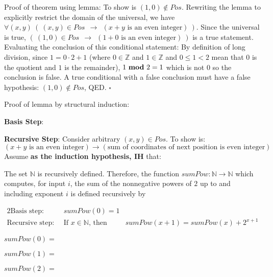 \documentclass[12pt, oneside]{article}
\begin{document}
Proof of theorem using lemma: To show is $(1,0) \notin Pos$. Rewriting the lemma to explicitly 
restrict the domain of the universal, 
we have $\forall (x,y) ~(~ (x,y) \in Pos~~  \to ~~(x+y \textrm{ is an even integer})~)$.  Since
the universal is true, 
$ (~ (1,0) \in Pos~~ \to ~~(1+0 \textrm{ is an even integer})~)$ is a true statement.
Evaluating the conclusion of this conditional statement: 
By definition of long division, since $1 = 0 \cdot 2 + 1$ (where $0 \in \mathbb{Z}$ and 
$1 \in \mathbb{Z}$ and $0 \leq 1 < 2$ mean that $0$ is the quotient and $1$ is the remainder), $1 ~\textrm{\bf mod}~ 2 = 1$ which is not $0$ 
so the conclusion is false.  A true conditional with a false conclusion must have a false hypothesis: $(1,0) \notin Pos$, QED. $\square$

\vspace{20pt}

Proof of lemma by structural induction:

{\bf Basis Step}:

\vspace{100pt}


{\bf Recursive Step}:  Consider arbitrary $(x,y) \in Pos$.  To show is:
\[
(x+y \text{ is an even integer}) \to (\text{sum of coordinates of next position is even integer})
\]
Assume {\bf as the induction hypothesis, IH} that: 


\vspace{400pt} \newpage


The set $\mathbb{N}$ is recursively defined.
Therefore, the function $sumPow: \mathbb{N} \to \mathbb{N}$
which computes, for input $i$, the sum of the nonnegative powers of $2$
up to and including exponent $i$ is defined
recursively by

\begin{alignat*}{2}
    \text{Basis step:  } \qquad & sumPow(0) = 1 &\\
    \text{Recursive step:  } & \text{If } x \in \mathbb{N} \text{, then } &sumPow(x+1) = sumPow(x) + 2^{x+1}
\end{alignat*}

$sumPow(0) =$

\vspace{20pt}

$sumPow(1) =$

\vspace{20pt}

$sumPow(2) =$

\vspace{20pt}
\end{document}
